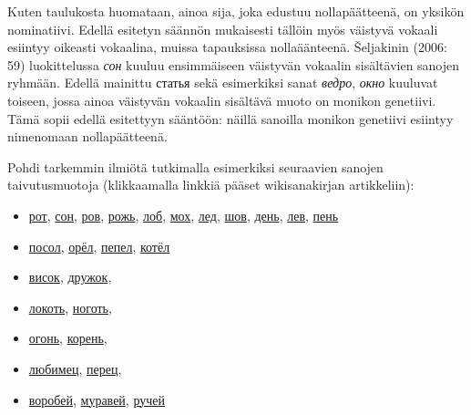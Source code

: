 \documentclass[]{scrartcl}
\providecommand{\tightlist}{%
  \setlength{\itemsep}{0pt}\setlength{\parskip}{0pt}}
\begin{document}
Kuten taulukosta huomataan, ainoa sija, joka edustuu nollapäätteenä, on
yksikön nominatiivi. Edellä esitetyn säännön mukaisesti tällöin myös
väistyvä vokaali esiintyy oikeasti vokaalina, muissa tapauksissa
nollaäänteenä. Šeljakinin (2006: 59) luokittelussa \emph{сон} kuuluu
ensimmäiseen väistyvän vokaalin sisältävien sanojen ryhmään. Edellä
mainittu статья sekä esimerkiksi sanat \emph{ведро}, \emph{окно}
kuuluvat toiseen, jossa ainoa väistyvän vokaalin sisältävä muoto on
monikon genetiivi. Tämä sopii edellä esitettyyn sääntöön: näillä
sanoilla monikon genetiivi esiintyy nimenomaan nollapäätteenä.

Pohdi tarkemmin ilmiötä tutkimalla esimerkiksi seuraavien sanojen
taivutusmuotoja (klikkaamalla linkkiä pääset wikisanakirjan
artikkeliin):

\begin{itemize}
\tightlist
\item
  \href{https://ru.wiktionary.org/wiki/рот}{рот},
  \href{https://ru.wiktionary.org/wiki/сон}{сон},
  \href{https://ru.wiktionary.org/wiki/ров}{ров},
  \href{https://ru.wiktionary.org/wiki/рожь}{рожь},
  \href{https://ru.wiktionary.org/wiki/лоб}{лоб},
  \href{https://ru.wiktionary.org/wiki/мох}{мох},
  \href{https://ru.wiktionary.org/wiki/лед}{лед},
  \href{https://ru.wiktionary.org/wiki/шов}{шов},
  \href{https://ru.wiktionary.org/wiki/день}{день},
  \href{https://ru.wiktionary.org/wiki/лев}{лев},
  \href{https://ru.wiktionary.org/wiki/пень}{пень}
\item
  \href{https://ru.wiktionary.org/wiki/посол}{посол},
  \href{https://ru.wiktionary.org/wiki/орёл}{орёл},
  \href{https://ru.wiktionary.org/wiki/пепел}{пепел},
  \href{https://ru.wiktionary.org/wiki/котёл}{котёл}
\item
  \href{https://ru.wiktionary.org/wiki/висок}{висок},
  \href{https://ru.wiktionary.org/wiki/дружок}{дружок},
\item
  \href{https://ru.wiktionary.org/wiki/локоть}{локоть},
  \href{https://ru.wiktionary.org/wiki/ноготь}{ноготь},
\item
  \href{https://ru.wiktionary.org/wiki/огонь}{огонь},
  \href{https://ru.wiktionary.org/wiki/корень}{корень},
\item
  \href{https://ru.wiktionary.org/wiki/любимец}{любимец},
  \href{https://ru.wiktionary.org/wiki/перец}{перец},
\item
  \href{https://ru.wiktionary.org/wiki/воробей}{воробей},
  \href{https://ru.wiktionary.org/wiki/муравей}{муравей},
  \href{https://ru.wiktionary.org/wiki/ручей}{ручей}
\end{itemize}
\end{document}
